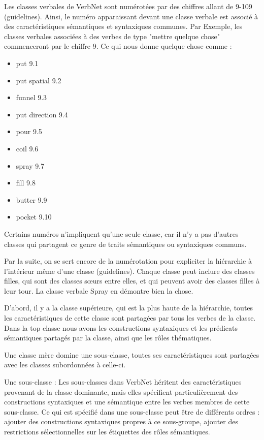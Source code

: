 Les classes verbales de VerbNet sont numérotées par des chiffres allant de 9-109 (guidelines). Ainsi, le numéro apparaissant devant une classe verbale est associé à des caractéristiques sémantiques et syntaxiques communes. Par Exemple, les classes verbales associées à des verbes de type "mettre quelque chose" commenceront par le chiffre 9. Ce qui nous donne quelque chose comme : 
\begin{itemize}
  \item put 9.1
  \item put spatial 9.2
	\item funnel 9.3
	\item put direction 9.4
	\item pour 9.5
	\item coil 9.6
	\item spray 9.7
	\item fill 9.8
	\item butter 9.9
	\item pocket 9.10
	
\end{itemize}

Certains numéros n'impliquent qu'une seule classe, car il n'y a pas d'autres classes qui partagent ce genre de traits sémantiques ou syntaxiques communs.

Par la suite, on se sert encore de la numérotation pour expliciter la hiérarchie à l'intérieur même d'une classe (guidelines). Chaque classe peut inclure des classes filles, qui sont des classes sœurs entre elles, et qui peuvent avoir des classes filles à leur tour. La classe verbale Spray en démontre bien la chose. 

D'abord, il y a la classe supérieure, qui est la plus haute de la hiérarchie, toutes les caractéristiques de cette classe sont partagées par tous les verbes de la classe. Dans la top classe nous avons les constructions syntaxiques et les prédicats sémantiques partagés par la classe, ainsi que les rôles thématiques. 

Une classe mère domine une sous-classe, toutes ses caractéristiques sont partagées avec les classes subordonnées à celle-ci. 

Une sous-classe : Les sous-classes dans VerbNet héritent des caractéristiques provenant de la classe dominante, mais elles spécifient particulièrement des constructions syntaxiques et une sémantique entre les verbes membres de cette sous-classe. Ce qui est spécifié dans une sous-classe peut être de différents ordres : ajouter des constructions syntaxiques propres à ce sous-groupe, ajouter des restrictions sélectionnelles sur les étiquettes des rôles sémantiques. 

